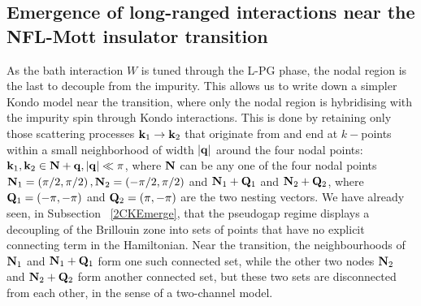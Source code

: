 \documentclass[reprint,hidelinks,onecolumn]{revtex4-2}
\begin{document}
\subsection{Emergence of long-ranged interactions near the NFL-Mott insulator transition}
As the bath interaction \(W\) is tuned through the L-PG phase, the nodal region is the last to decouple from the impurity. This allows us to write down a simpler Kondo model near the transition, where only the nodal region is hybridising with the impurity spin through Kondo interactions. This is done by retaining only those scattering processes \({\bf k}_1 \to {\bf k}_2\) that originate from and end at \(k-\)points within a small neighborhood of width \(|{\bf q}|\) around the four nodal points: \({\bf k}_1, {\bf k}_2 \in {\bf N} + {\bf q}, |{\bf q}| \ll \pi\), where \({\bf N}\) can be any one of the four nodal points \({\bf N}_{1} = \left(\pi/2, \pi/2\right), {\bf N}_{2} = \left(-\pi/2, \pi/2\right)\) and \({\bf N}_1 + {\bf Q}_1\) and \({\bf N}_{2} + {\bf Q}_2\), where \({\bf Q}_1 = \left(-\pi,-\pi \right)\) and \({\bf Q}_2 = \left( \pi, -\pi \right) \) are the two nesting vectors. We have already seen, in Subsection ~\ref{2CKEmerge}, that the pseudogap regime displays a decoupling of the Brillouin zone into sets of points that have no explicit connecting term in the Hamiltonian. Near the transition, the neighbourhoods of \({\bf N}_{1}\) and \({\bf N}_{1} + {\bf Q}_1\) form one such connected set, while the other two nodes \({\bf N}_{2}\) and \({\bf N}_{2} + {\bf Q}_2\) form another connected set, but these two sets are disconnected from each other, in the sense of a two-channel model. 
\end{document}

